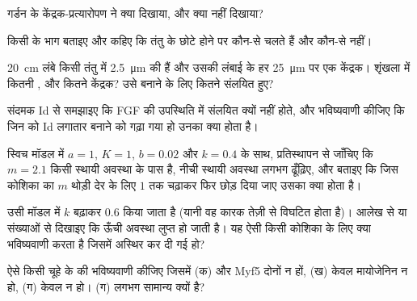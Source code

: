 \begin{exercise}[$\star$]\label{exo:b2:cell-differentiation:3}
गर्डन के केंद्रक-प्रत्यारोपण ने क्या दिखाया, और क्या नहीं दिखाया?
\end{exercise}

\begin{exercise}[$\star$]\label{exo:b2:cell-differentiation:4}
किसी  के भाग बताइए और कहिए कि तंतु के छोटे होने पर
कौन-से चलते हैं और कौन-से नहीं।
\end{exercise}

\begin{exercise}[$\star\star$]\label{exo:b2:cell-differentiation:5}
\qty{20}{cm} लंबे किसी तंतु में \qty{2.5}{\micro m} की  हैं और
उसकी लंबाई के हर \qty{25}{\micro m} पर एक केंद्रक। शृंखला में कितनी
, और कितने केंद्रक? उसे बनाने के लिए कितने  संलयित
हुए?
\end{exercise}

\begin{exercise}[$\star\star$]\label{exo:b2:cell-differentiation:6}
संदमक Id से समझाइए कि FGF की उपस्थिति में  संलयित क्यों नहीं
होते, और भविष्यवाणी कीजिए कि जिन  को Id लगातार
बनाने को गढ़ा गया हो उनका क्या होता है।
\end{exercise}

\begin{exercise}[$\star\star$]\label{exo:b2:cell-differentiation:7}
स्विच मॉडल में $a = 1$, $K = 1$, $b = 0.02$ और $k = 0.4$ के साथ,
प्रतिस्थापन से जाँचिए कि $m = 2.1$ किसी स्थायी अवस्था के पास है,
नीची स्थायी अवस्था लगभग ढूँढ़िए, और बताइए कि जिस कोशिका का $m$ थोड़ी देर
के लिए $1$ तक चढ़ाकर फिर छोड़ दिया जाए उसका क्या होता है।
\end{exercise}

\begin{exercise}[$\star\star$]\label{exo:b2:cell-differentiation:8}
उसी मॉडल में $k$ बढ़ाकर $0.6$ किया जाता है (यानी वह कारक तेज़ी से
विघटित होता है)। आलेख से या संख्याओं से दिखाइए कि ऊँची अवस्था
लुप्त हो जाती है। यह ऐसी किसी कोशिका के लिए क्या भविष्यवाणी करता है
जिसमें  अस्थिर कर दी गई हो?
\end{exercise}

\begin{exercise}[$\star\star$]\label{exo:b2:cell-differentiation:9}
ऐसे किसी चूहे के  की भविष्यवाणी कीजिए जिसमें (क)  और
Myf5 दोनों न हों, (ख) केवल मायोजेनिन न हो, (ग) केवल  न हो। (ग) लगभग सामान्य क्यों है?
\end{exercise}

